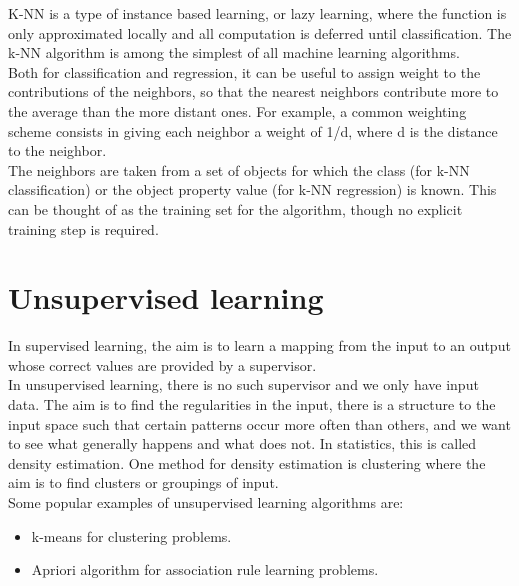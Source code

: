 K-NN is a type of instance based learning, or lazy learning, where the function is only approximated locally and all computation is deferred until classification. The k-NN algorithm is among the simplest of all machine learning algorithms.\\ Both for classification and regression, it can be useful to assign weight to the contributions of the neighbors, so that the nearest neighbors contribute more to the average than the more distant ones. For example, a common weighting scheme consists in giving each neighbor a weight of 1/d, where d is the distance to the neighbor.\\ The neighbors are taken from a set of objects for which the class (for k-NN classification) or the object property value (for k-NN regression) is known. This can be thought of as the training set for the algorithm, though no explicit training step is required.



\section{Unsupervised learning}

In supervised learning, the aim is to learn a mapping from the input to
an output whose correct values are provided by a supervisor.\\
In unsupervised
learning, there is no such supervisor and we only have input data.
The aim is to find the regularities in the input, there is a structure to the
input space such that certain patterns occur more often than others, and we want to see what generally happens and what does not. In statistics, this is called density estimation.
One method for density estimation is clustering where the aim is to
find clusters or groupings of input.\\ 
Some popular examples of unsupervised learning algorithms are:


\begin{itemize}
  \item k-means for clustering problems.
  \item Apriori algorithm for association rule learning problems.
\end{itemize}


